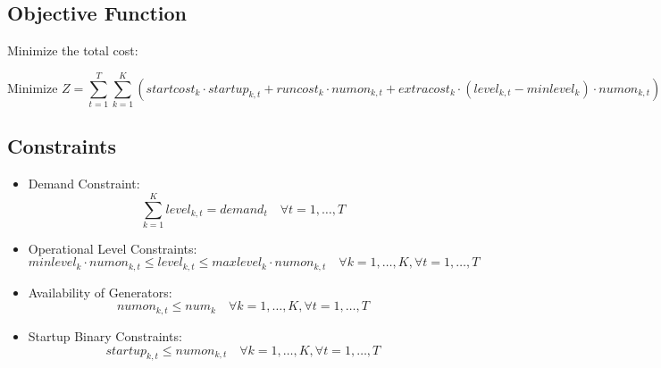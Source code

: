 \documentclass{article}
\begin{document}
\subsection*{Objective Function}

Minimize the total cost:

\[
\text{Minimize } Z = \sum_{t=1}^{T} \sum_{k=1}^{K} \left( startcost_{k} \cdot startup_{k,t} + runcost_{k} \cdot numon_{k,t} + extracost_{k} \cdot (level_{k,t} - minlevel_{k}) \cdot numon_{k,t} \right)
\]

\subsection*{Constraints}

\begin{itemize}
    \item Demand Constraint:
    \[
    \sum_{k=1}^{K} level_{k,t} = demand_{t} \quad \forall t = 1,\ldots,T
    \]

    \item Operational Level Constraints:
    \[
    minlevel_{k} \cdot numon_{k,t} \leq level_{k,t} \leq maxlevel_{k} \cdot numon_{k,t} \quad \forall k = 1,\ldots,K, \forall t = 1,\ldots,T
    \]

    \item Availability of Generators:
    \[
    numon_{k,t} \leq num_{k} \quad \forall k = 1,\ldots,K, \forall t = 1,\ldots,T
    \]

    \item Startup Binary Constraints:
    \[
    startup_{k,t} \leq numon_{k,t} \quad \forall k = 1,\ldots,K, \forall t = 1,\ldots,T
    \]
\end{itemize}
\end{document}
